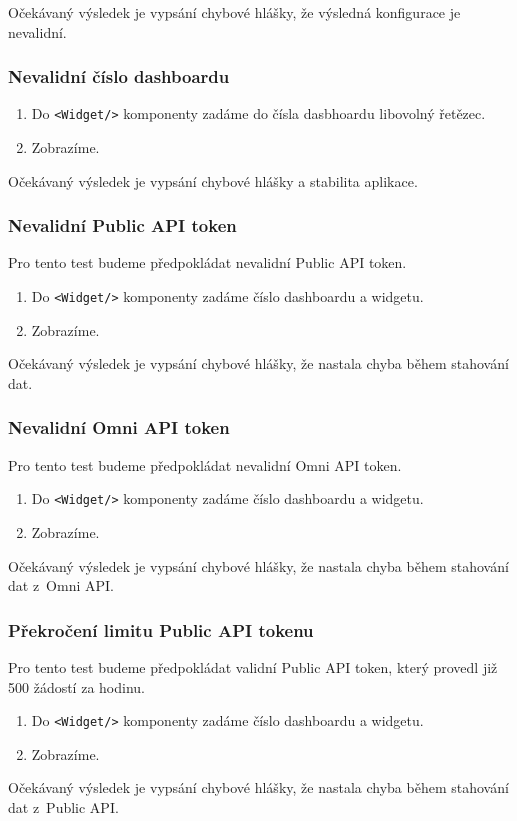 \documentclass[czech, bc, kiv, he, iso690numb]{fasthesis}
\begin{document}
Očekávaný výsledek je vypsání chybové hlášky, že výsledná konfigurace je nevalidní.

\subsubsection{Nevalidní číslo dashboardu}
\begin{enumerate}
	\item Do \texttt{<Widget/>} komponenty zadáme do čísla dasbhoardu libovolný řetězec.
	\item Zobrazíme.
\end{enumerate}
Očekávaný výsledek je vypsání chybové hlášky a stabilita aplikace.

\subsubsection{Nevalidní Public API token}
Pro tento test budeme předpokládat nevalidní Public API token.
\begin{enumerate}
	\item Do \texttt{<Widget/>} komponenty zadáme číslo dashboardu a widgetu.
	\item Zobrazíme.
\end{enumerate}
Očekávaný výsledek je vypsání chybové hlášky, že nastala chyba během stahování dat.

\subsubsection{Nevalidní Omni API token}
Pro tento test budeme předpokládat nevalidní Omni API token.
\begin{enumerate}
	\item Do \texttt{<Widget/>} komponenty zadáme číslo dashboardu a widgetu.
	\item Zobrazíme.
\end{enumerate}
Očekávaný výsledek je vypsání chybové hlášky, že nastala chyba během stahování dat z~Omni API.

\subsubsection{Překročení limitu Public API tokenu}
Pro tento test budeme předpokládat validní Public API token, který provedl již 500 žádostí za hodinu.
\begin{enumerate}
	\item Do \texttt{<Widget/>} komponenty zadáme číslo dashboardu a widgetu.
	\item Zobrazíme.
\end{enumerate}
Očekávaný výsledek je vypsání chybové hlášky, že nastala chyba během stahování dat z~Public API.
\end{document}
